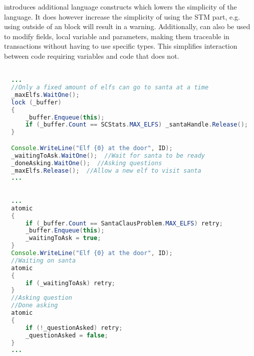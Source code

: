 \stmnamesp introduces additional language constructs which lowers the simplicity of the language. It does however increase the simplicity of using the \ac{STM} part, e.g. using  outside of an  block will result in a warning. Additionally,  can also be used to modify fields, local variable and parameters, making them traceable in transactions without having to use specific types. This simplifies interaction between code requiring  variables and code that does not. 


\begin{lstlisting}[label=lst:lock_elf,
  caption={Santa \bscode{Start} Method - C\# locking},
  language=Java,  
  showspaces=false,
  showtabs=false,
  breaklines=true,
  showstringspaces=false,
  breakatwhitespace=true,
  escapechar=~,
  commentstyle=\color{greencomments},
  keywordstyle=\color{bluekeywords},
  stringstyle=\color{redstrings},
  morekeywords={atomic, retry, orelse, var, get, set, ref, out}]  % Start your code-block

  ...
  //Only a fixed amount of elfs can go to santa at a time
  _maxElfs.WaitOne();
  lock (_buffer)
  {
      _buffer.Enqueue(this);
      if (_buffer.Count == SCStats.MAX_ELFS) _santaHandle.Release();
  }

  Console.WriteLine("Elf {0} at the door", ID);
  _waitingToAsk.WaitOne();  //Wait for santa to be ready
  _doneAsking.WaitOne();  //Asking questions
  _maxElfs.Release();  //Allow a new elf to visit santa
  ...
\end{lstlisting}

\begin{lstlisting}[label=lst:lang_elf,
  caption={Santa \bscode{Start} Method - \stmname},
  language=Java,  
  showspaces=false,
  showtabs=false,
  breaklines=true,
  showstringspaces=false,
  breakatwhitespace=true,
  escapechar=~,
  commentstyle=\color{greencomments},
  keywordstyle=\color{bluekeywords},
  stringstyle=\color{redstrings},
  morekeywords={atomic, retry, orelse, var, get, set, ref, out}]  % Start your code-block

  ...
  atomic
  {
      if (_buffer.Count == SantaClausProblem.MAX_ELFS) retry;
      _buffer.Enqueue(this);
      _waitingToAsk = true;
  }
  Console.WriteLine("Elf {0} at the door", ID);
  //Waiting on santa
  atomic
  {
      if (_waitingToAsk) retry; 
  }
  //Asking question
  //Done asking
  atomic
  {
      if (!_questionAsked) retry; 
      _questionAsked = false;
  }
  ...
\end{lstlisting}


